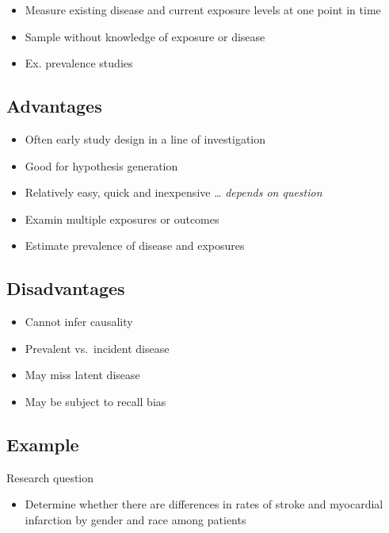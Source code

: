 \documentclass[
]{book}
\providecommand{\tightlist}{%
  \setlength{\itemsep}{0pt}\setlength{\parskip}{0pt}}
\begin{document}
\begin{itemize}
\tightlist
\item
  Measure existing disease and current exposure levels at one point in time
\item
  Sample without knowledge of exposure or disease
\item
  Ex. prevalence studies
\end{itemize}

\hypertarget{advantages}{%
\subsection{Advantages}\label{advantages}}

\begin{itemize}
\tightlist
\item
  Often early study design in a line of investigation
\item
  Good for hypothesis generation
\item
  Relatively easy, quick and inexpensive \ldots{} \emph{depends on question}
\item
  Examin multiple exposures or outcomes
\item
  Estimate prevalence of disease and exposures
\end{itemize}

\hypertarget{disadvantages}{%
\subsection{Disadvantages}\label{disadvantages}}

\begin{itemize}
\tightlist
\item
  Cannot infer causality
\item
  Prevalent vs.~incident disease
\item
  May miss latent disease
\item
  May be subject to recall bias
\end{itemize}

\hypertarget{example}{%
\subsection{Example}\label{example}}

Research question

\begin{itemize}
\tightlist
\item
  Determine whether there are differences in rates of stroke and myocardial infarction by gender and race among patients
\end{itemize}
\end{document}
